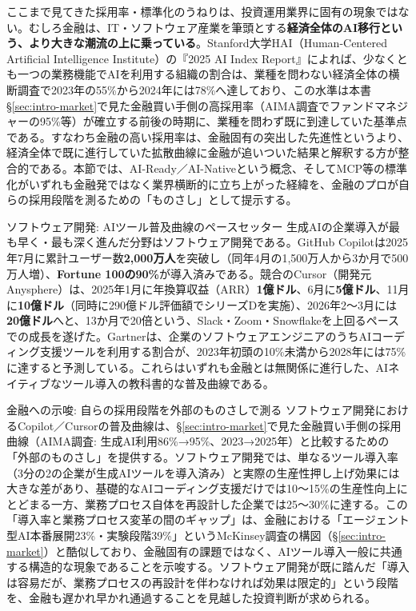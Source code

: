 ここまで見てきた採用率・標準化のうねりは、投資運用業界に固有の現象ではない。むしろ金融は、IT・ソフトウェア産業を筆頭とする\textbf{経済全体のAI移行という、より大きな潮流の上に乗っている}。Stanford大学HAI（Human-Centered Artificial Intelligence Institute）の『2025 AI Index Report』によれば、少なくとも一つの業務機能でAIを利用する組織の割合は、業種を問わない経済全体の横断調査で2023年の55\%から2024年には78\%へ達しており\cite{y01stanfordhai2025aiindex}、この水準は本書\S\ref{sec:intro-market}で見た金融買い手側の高採用率（AIMA調査でファンドマネジャーの95\%\cite{x01aima2025}等）が確立する前後の時期に、業種を問わず既に到達していた基準点である。すなわち金融の高い採用率は、金融固有の突出した先進性というより、経済全体で既に進行していた拡散曲線に金融が追いついた結果と解釈する方が整合的である。本節では、AI-Ready／AI-Nativeという概念、そしてMCP等の標準化がいずれも金融発ではなく業界横断的に立ち上がった経緯を、金融のプロが自らの採用段階を測るための「ものさし」として提示する。

\begin{casestudy}{ソフトウェア開発: AIツール普及曲線のペースセッター}
生成AIの企業導入が最も早く・最も深く進んだ分野はソフトウェア開発である。GitHub Copilotは2025年7月に累計ユーザー数\textbf{2,000万人}を突破し（同年4月の1,500万人から3か月で500万人増）、\textbf{Fortune 100の90\%}が導入済みである\cite{y01techcrunch2025copilot20m}。競合のCursor（開発元Anysphere）は、2025年1月に年換算収益（ARR）\textbf{1億ドル}、6月に\textbf{5億ドル}、11月に\textbf{10億ドル}（同時に290億ドル評価額でシリーズDを実施）、2026年2〜3月には\textbf{20億ドル}へと、13か月で20倍という、Slack・Zoom・Snowflakeを上回るペースでの成長を遂げた\cite{y01techcrunch2025cursorarr,y01businesswire2025cursorseriesd}。Gartnerは、企業のソフトウェアエンジニアのうちAIコーディング支援ツールを利用する割合が、2023年初頭の10\%未満から2028年には75\%に達すると予測している\cite{y01gartner2024aicodeassist}。これらはいずれも金融とは無関係に進行した、AIネイティブなツール導入の教科書的な普及曲線である。
\end{casestudy}

\begin{insight}{金融への示唆: 自らの採用段階を外部のものさしで測る}
ソフトウェア開発におけるCopilot／Cursorの普及曲線は、\S\ref{sec:intro-market}で見た金融買い手側の採用曲線（AIMA調査: 生成AI利用86\%→95\%、2023→2025年）と比較するための「外部のものさし」を提供する。ソフトウェア開発では、単なるツール導入率（3分の2の企業が生成AIツールを導入済み\cite{y01bain2025techreport}）と実際の生産性押し上げ効果には大きな差があり、基礎的なAIコーディング支援だけでは10〜15\%の生産性向上にとどまる一方、業務プロセス自体を再設計した企業では25〜30\%に達する\cite{y01bain2025techreport}。この「導入率と業務プロセス変革の間のギャップ」は、金融における「エージェント型AI本番展開23\%・実験段階39\%」というMcKinsey調査の構図（\S\ref{sec:intro-market}）と酷似しており、金融固有の課題ではなく、AIツール導入一般に共通する構造的な現象であることを示唆する。ソフトウェア開発が既に踏んだ「導入は容易だが、業務プロセスの再設計を伴わなければ効果は限定的」という段階を、金融も遅かれ早かれ通過することを見越した投資判断が求められる。
\end{insight}

